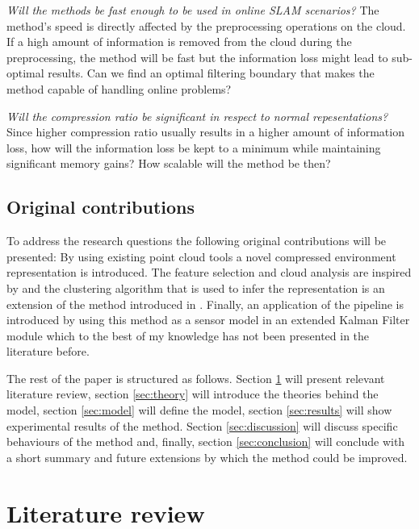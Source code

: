 \documentclass[twoside,hidelinks]{article}
\begin{document}
\textit{Will the methods be fast enough to be used in online SLAM scenarios? }
The method's speed is directly affected by the preprocessing operations on the cloud. If a high amount of information is removed from the cloud during the preprocessing, the method will be fast but the information loss might lead to sub-optimal results. Can we find an optimal filtering boundary that makes the method capable of handling online problems?

\textit{Will the compression ratio be significant in respect to normal repesentations?}
Since higher compression ratio usually results in a higher amount of information loss, how will the information loss be kept to a minimum while maintaining significant memory gains? How scalable will the method be then?

\subsection{Original contributions}

To address the research questions the following original contributions will be presented:
By using existing point cloud tools \cite{pcl} a novel compressed environment representation is introduced.
The feature selection and cloud analysis are inspired by \cite{objectpointSLAM} and
the clustering algorithm that is used to infer the representation is an extension of the method introduced in \cite{smcddp}.
Finally, an application of the pipeline is introduced by using this method as a sensor model in an extended Kalman Filter module which to the best of my knowledge has not been presented in the literature before.


The rest of the paper is structured as follows. Section \ref{sec:literature} will present relevant literature review, section \ref{sec:theory} will introduce the theories behind the model, section \ref{sec:model} will define the model, section \ref{sec:results} will show experimental results of the method. Section \ref{sec:discussion} will discuss specific behaviours of the method and, finally, section \ref{sec:conclusion} will conclude with a short summary and future extensions by which the method could be improved.


\newpage
\section{Literature review}
\label{sec:literature}
\end{document}
